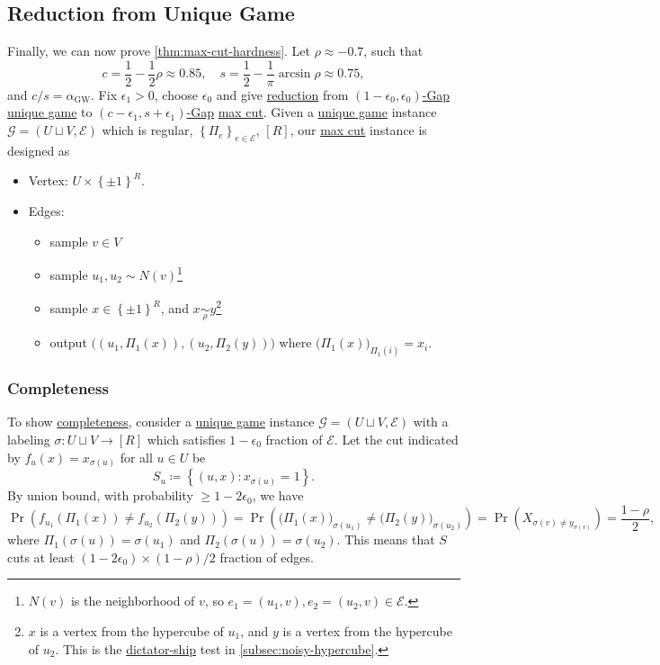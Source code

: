 \subsection{Reduction from Unique Game}
Finally, we can now prove \autoref{thm:max-cut-hardness}. Let \(\rho \approx -0.7\), such that
\[
	c = \frac{1}{2} - \frac{1}{2}\rho \approx 0.85, \quad s = \frac{1}{2} - \frac{1}{\pi }\arcsin \rho \approx 0.75,
\]
and \(c / s = \alpha _{\mathrm{GW} }\). Fix \(\epsilon _1 > 0\), choose \(\epsilon _0\) and give \hyperref[def:reduction]{reduction} from \hyperref[def:c-s-Gap]{\((1-\epsilon _0, \epsilon _0)\)-Gap} \hyperref[prb:unique-game]{unique game} to \hyperref[def:c-s-Gap]{\((c-\epsilon _1, s+\epsilon _1)\)-Gap} \hyperref[prb:max-cut]{max cut}. Given a \hyperref[prb:unique-game]{unique game} instance \(\mathcal{G} = (U \sqcup V , \mathcal{E} )\) which is regular, \(\left\{ \Pi _e \right\}_{e\in \mathcal{E} } \), \([R]\), our \hyperref[prb:max-cut]{max cut} instance is designed as
\begin{itemize}
	\item Vertex: \(U \times \left\{ \pm 1 \right\} ^R\).
	\item Edges:
	      \begin{itemize}
		      \item sample \(v\in V\)
		      \item sample \(u_1, u_2 \sim N(v)\)\footnote{\(N(v)\) is the neighborhood of \(v\), so \(e_1 = (u_1, v), e_2 = (u_2, v)\in \mathcal{E} \).}
		      \item sample \(x\in \left\{ \pm 1 \right\} ^R\), and \(x \underset{\rho }{\sim } y\)\footnote{\(x\) is a vertex from the hypercube of \(u_1\), and \(y\) is a vertex from the hypercube of \(u_2\). This is the \hyperref[def:dictation]{dictator-ship} test in \autoref{subsec:noisy-hypercube}.}
		      \item output \(\big( (u_1, \Pi _1(x)), (u_2, \Pi _2(y))\big)\) where \(\big(\Pi _1(x)\big)_{\Pi _1(i)} = x_i\).
	      \end{itemize}
\end{itemize}

\subsubsection{Completeness}
To show \hyperref[def:completeness]{completeness}, consider a \hyperref[prb:unique-game]{unique game} instance \(\mathcal{G} = (U \sqcup V, \mathcal{E} )\) with a labeling \(\sigma \colon U \sqcup V \to [R]\) which satisfies \(1 - \epsilon _0\) fraction of \(\mathcal{E} \). Let the cut indicated by \(f_u(x) = x_{\sigma (u)}\) for all \(u\in U\) be
\[
	S_u \coloneqq \left\{ (u, x) \colon x_{\sigma (u)} = 1 \right\}.
\]
By union bound, with probability \(\geq 1 - 2 \epsilon_0 \), we have
\[
	\Pr_{}(f_{u_1}(\Pi _1(x)) \neq f_{u_2}(\Pi _2(y)))
	= \Pr_{}(\big(\Pi _1(x)\big)_{\sigma (u_1)} \neq \big(\Pi _2(y)\big)_{\sigma (u_2)})
	= \Pr_{}(X_{\sigma (v) \neq y_{\sigma (v)}})
	= \frac{1-\rho }{2},
\]
where \(\Pi _1(\sigma (u)) = \sigma (u_1)\) and \(\Pi _2(\sigma (u)) = \sigma (u_2)\). This means that \(S\) cuts at least \((1 - 2\epsilon _0)\times (1-\rho )/2\) fraction of edges.

